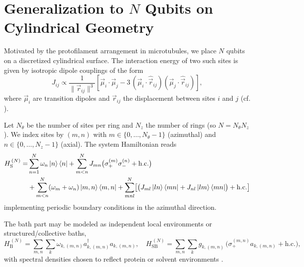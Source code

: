
\section{Generalization to \texorpdfstring{$N$}{N} Qubits on Cylindrical Geometry}

Motivated by the protofilament arrangement in microtubules, we place $N$ qubits on a discretized cylindrical surface. The interaction energy of two such sites is given by isotropic dipole couplings of the form \cite{griffiths2013introductionelectrodynamics}
\begin{equation}
	J_{ij} \propto \frac{1}{ \lVert \vec{r}_{ij} \rVert^{3} }
	\left[
		\vec{\mu}_i \cdot \vec{\mu}_j - 3\,(\vec{\mu}_i \cdot \hat{\vec{r}}_{ij})(\vec{\mu}_j \cdot \hat{\vec{r}}_{ij})
		\right],
	\label{eq:dipole_dipole}
\end{equation}
where $\vec{\mu}_i$ are transition dipoles and $\vec{r}_{ij}$ the displacement between sites $i$ and $j$ (cf. \cite{lehmberg1970radiationatomsystem,masters2014pathsforstersresonance}).

Let $N_{\theta}$ be the number of sites per ring and $N_{z}$ the number of rings (so $N = N_{\theta} N_{z}$). We index sites by $(m,n)$ with $m\in\{0,\dots,N_{\theta}-1\}$ (azimuthal) and $n\in\{0,\dots,N_{z}-1\}$ (axial). The system Hamiltonian reads
\begin{align}
	H_{\mathrm{S}}^{\,(N)} = & \sum_{n=1}^{N} \omega_{n} \ket{n}\bra{n} + \sum_{m<n}^{N} J_{mn} \bigl( \sigma_{+}^{(m)} \sigma_{-}^{(n)} + \mathrm{h.c.} \bigr) \\
	                         & + \sum_{m<n}^{N} (\omega_{m} + \omega_{n}) \ket{m, n}\bra{m, n}
	+ \sum_{m n l}^{N} \bigl[ \bigl( J_{ml} \ket{ln}\bra{mn}
		+ J_{nl} \ket{lm}\bra{mn} \bigr) + \mathrm{h.c.} \bigr]
	\label{eq:Nqubit_hamiltonian}
\end{align}
implementing periodic boundary conditions in the azimuthal direction.

The bath part may be modeled as independent local environments or structured/collective baths,
\begin{equation}
	H_{\mathrm{B}}^{\,(N)} = \sum_{m,n} \sum_{k} \omega_{k,(m,n)} a_{k,(m,n)}^{\dagger} a_{k,(m,n)},
	\quad
	H_{\mathrm{SB}}^{\,(N)} = \sum_{m,n} \sum_{k} g_{k,(m,n)}\,\bigl( \sigma_{+}^{(m,n)} a_{k,(m,n)} + \mathrm{h.c.} \bigr),
	\label{eq:Nqubit_bath}
\end{equation}
with spectral densities chosen to reflect protein or solvent environments \cite{rodenetal2012accountingintramolecularvibrational,ritscheleisfeld2014analyticrepresentationsbath}.


